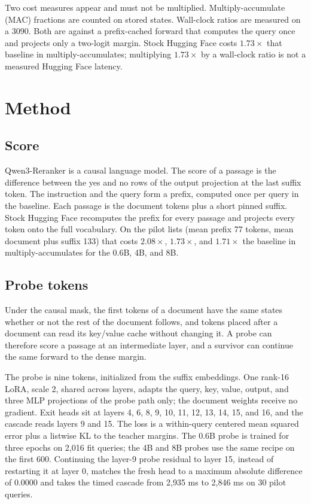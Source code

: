 \documentclass[11pt, a4paper]{article}
\begin{document}
Two cost measures appear and must not be multiplied.
Multiply-accumulate (MAC) fractions are counted on stored states.
Wall-clock ratios are measured on a 3090.
Both are against a prefix-cached forward that computes the query once and projects only a two-logit margin.
Stock Hugging Face costs $1.73\times$ that baseline in multiply-accumulates; multiplying $1.73\times$ by a wall-clock ratio is not a measured Hugging Face latency.

\section{Method}
\label{sec:method}

\subsection{Score}

Qwen3-Reranker is a causal language model.
The score of a passage is the difference between the yes and no rows of the output projection at the last suffix token.
The instruction and the query form a prefix, computed once per query in the baseline.
Each passage is the document tokens plus a short pinned suffix.
Stock Hugging Face recomputes the prefix for every passage and projects every token onto the full vocabulary.
On the pilot lists (mean prefix 77 tokens, mean document plus suffix 133) that costs $2.08\times$, $1.73\times$, and $1.71\times$ the baseline in multiply-accumulates for the 0.6B, 4B, and 8B.

\subsection{Probe tokens}

Under the causal mask, the first tokens of a document have the same states whether or not the rest of the document follows, and tokens placed after a document can read its key/value cache without changing it.
A probe can therefore score a passage at an intermediate layer, and a survivor can continue the same forward to the dense margin.

The probe is nine tokens, initialized from the suffix embeddings.
One rank-16 LoRA, scale 2, shared across layers, adapts the query, key, value, output, and three MLP projections of the probe path only; the document weights receive no gradient.
Exit heads sit at layers 4, 6, 8, 9, 10, 11, 12, 13, 14, 15, and 16, and the cascade reads layers 9 and 15.
The loss is a within-query centered mean squared error plus a listwise KL to the teacher margins.
The 0.6B probe is trained for three epochs on 2,016 fit queries; the 4B and 8B probes use the same recipe on the first 600.
Continuing the layer-9 probe residual to layer 15, instead of restarting it at layer 0, matches the fresh head to a maximum absolute difference of $0.0000$ and takes the timed cascade from 2,935 ms to 2,846 ms on 30 pilot queries.
\end{document}
